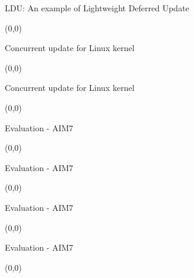 \documentclass[english]{beamer} %
\begin{document}
\begin{frame}{LDU: An example of Lightweight Deferred Update}
\begin{textblock}{1}(0,0)
\end{textblock}
\end{frame}



\begin{frame}{Concurrent update for Linux kernel}
\begin{textblock}{1}(0,0)
\end{textblock}
\end{frame}


\begin{frame}{Concurrent update for Linux kernel}
\begin{textblock}{1}(0,0)
\end{textblock}
\end{frame}


\begin{frame}{Evaluation - AIM7}
\begin{textblock}{1}(0,0)
\end{textblock}
\end{frame}


\begin{frame}{Evaluation - AIM7}
\begin{textblock}{1}(0,0)
\end{textblock}
\end{frame}

\begin{frame}{Evaluation - AIM7}
\begin{textblock}{1}(0,0)
\end{textblock}
\end{frame}

\begin{frame}{Evaluation - AIM7}
\begin{textblock}{1}(0,0)
\end{textblock}
\end{frame}
\end{document}
